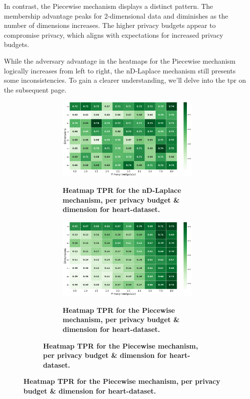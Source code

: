 In contrast, the Piecewise mechanism displays a distinct pattern. The membership advantage peaks for 2-dimensional data and diminishes as the number of dimensions increases. The higher privacy budgets appear to compromise privacy, which aligns with expectations for increased privacy budgets.

While the adversary advantage in the heatmaps for the Piecewise mechanism logically increases from left to right, the nD-Laplace mechanism still presents some inconsistencies. To gain a clearer understanding, we'll delve into the \gls{tpr} on the subsequent page.
\newpage
\begin{figure}[H]
  \centering
  \begin{subfigure}[b]{0.75\textwidth}
    \begin{subfigure}[c]{1\textwidth}
      \caption{\textbf{Heatmap TPR for the nD-Laplace mechanism, per privacy budget \& dimension for heart-dataset.}}
      \includegraphics[width=1\textwidth]{Results/nd-laplace/nd-Laplace/heart-dataset/tpr.png}
      \label{fig:privacy_tpr_heart-dataset_adversial_advantage_kd-laplace}
    \end{subfigure}
    \vfill %

    \begin{subfigure}[c]{1\textwidth}
      \caption{\textbf{Heatmap TPR for the Piecewise mechanism, per privacy budget \& dimension for heart-dataset.}}
      \includegraphics[width=1\textwidth]{Results/nd-laplace/piecewise/heart-dataset/tpr.png}
      \label{fig:privacy_tpr_heart-dataset_adversial_advantage_piecewise}
    \end{subfigure}
  \end{subfigure}
\end{figure}
